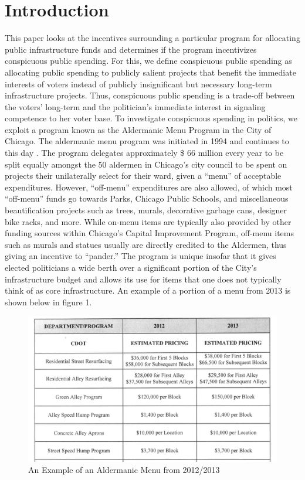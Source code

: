 \section*{Introduction}
This paper looks at the incentives surrounding a particular program for allocating public infrastructure funds and determines if the program incentivizes conspicuous public spending.
For this, we define conspicuous public spending as allocating public spending to publicly salient projects that benefit the immediate interests of voters instead of publicly insignificant but necessary long-term infrastructure projects. 
Thus, conspicuous public spending is a trade-off between the voters' long-term and the politician's immediate interest in signaling competence to her voter base. 
To investigate conspicuous spending in politics, we exploit a program known as the Aldermanic Menu Program in the City of Chicago. 
The aldermanic menu program was initiated in 1994 and continues to this day \cite{OIGaudit}. 
The program delegates approximately \$ 66 million every year to be split equally amongst the 50 aldermen in Chicago's city council to be spent on projects their unilaterally select for their ward, given a ``menu'' of acceptable expenditures. 
However, ``off-menu'' expenditures are also allowed, of which most ``off-menu'' funds go towards Parks, Chicago Public Schools, and miscellaneous beautification projects such as trees, murals, decorative garbage cans, designer bike racks, and more\cite{OIGaudit}. 
While on-menu items are typically also provided by other funding sources within Chicago's Capital Improvement Program, off-menu items such as murals and statues usually are directly credited to the Aldermen, thus giving an incentive to ``pander.''  
The program is unique insofar that it gives elected politicians a wide berth over a significant portion of the City's infrastructure budget and allows its use for items that one does not typically think of as core infrastructure. 
An example of a portion of a menu from 2013 is shown below in figure 1.


\begin{figure}[H]
    \centering
    \caption{An Example of an Aldermanic Menu from 2012/2013}
    \includegraphics[scale=0.38]{input/menu_example.png}
\end{figure}

